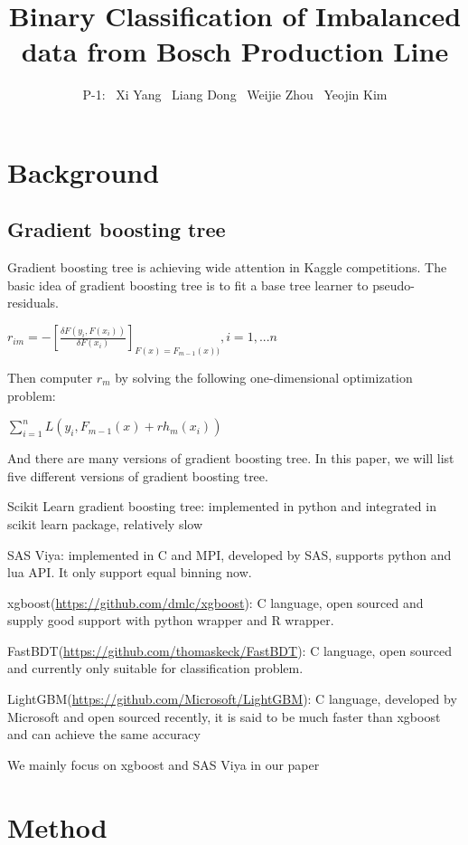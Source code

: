 \documentclass{article}
\title{Binary Classification of Imbalanced data from Bosch Production Line}
\author{
    P-1: \ Xi Yang \ Liang Dong \ Weijie Zhou \ Yeojin Kim
}
\begin{document}

\maketitle

\section{Background}
\subsection{Gradient boosting tree}


Gradient boosting tree is achieving wide attention in Kaggle competitions. The basic idea of gradient boosting tree is to fit a base tree learner to pseudo-residuals.
\begin{center}
$r_{im} =-[\frac{\delta F(y_{i},F(x_{i}))}{\delta F(x_{i})} ]_{F(x)=F_{m-1}(x))}, i=1,...n$
\end{center}

Then computer $r_{m}$ by solving the following one-dimensional optimization problem:
\begin{center}
$\sum_{i=1}^{n}L(y_{i},F_{m-1}(x)+rh_{m}(x_{i}))$
\end{center}


And there are many versions of gradient boosting tree. In this paper, we will list five different versions of gradient boosting tree. 

Scikit Learn gradient boosting tree: implemented in python and integrated in scikit learn package, relatively slow 

SAS Viya: implemented in C and MPI, developed by SAS, supports python and lua API. It only support equal binning now.

xgboost(\url{https://github.com/dmlc/xgboost}): C language, open sourced and supply good support with python wrapper and R wrapper.

FastBDT(\url{https://github.com/thomaskeck/FastBDT}):  C language, open sourced and currently only suitable for classification problem.

LightGBM(\url{https://github.com/Microsoft/LightGBM}): C language, developed by Microsoft and open sourced recently, it is said to be much faster than xgboost and can achieve the same accuracy

We mainly focus on xgboost and SAS Viya in our paper


\section{Method}
\end{document}
